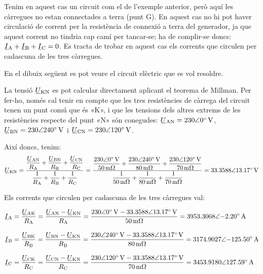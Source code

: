 	
\begin{exemple}[\MillmanTrifNoNeutre{}]
	\addcontentsxms{\MillmanTrifNoNeutre}	
    Tenim en aquest cas un circuit com el de l'exemple anterior, però aquí les càrregues no estan connectades a terra (punt G). En aquest cas no hi pot haver circulació de corrent per la resistència de connexió a terra del generador, ja que aquest corrent no tindria cap camí per tancar-se; ha de complir-se doncs: $\cmplx{I}\ped{A} + \cmplx{I}\ped{B} + \cmplx{I}\ped{C} = 0$. Es tracta de trobar en aquest cas els corrents que circulen per cadascuna de les tres càrregues.

    En el dibuix  següent es pot veure el circuit elèctric que es vol resoldre.

	\begin{center}
		
	\end{center}
   
    La tensió $\cmplx{U}\ped{KN}$ es pot calcular directament aplicant el teorema de Millman. Per fer-ho, només cal tenir en compte que les tres resistències de càrrega del circuit tenen un punt comú que és «K», i que les tensions dels altres extrems de les resistències respecte del punt «N» són conegudes: $\cmplx{U}\ped{AN}=\complexqty{230:0}{V}$, $\cmplx{U}\ped{BN}=\complexqty{230:240}{V}$ i $\cmplx{U}\ped{CN}=\complexqty{230:120}{V}$.

    Així doncs, tenim:
    \[
    \cmplx{U}\ped{KN} = \frac{ \dfrac{\cmplx{U}\ped{AN}}{R\ped{A}} + \dfrac{\cmplx{U}\ped{BN}}{R\ped{B}} + \dfrac{\cmplx{U}\ped{CN}}{R\ped{C}}} { \dfrac{1}{R\ped{A}} + \dfrac{1}{R\ped{B}} + \dfrac{1}{R\ped{C}}} =
    \frac{\dfrac{\complexqty{230:0}{V}}{\qty{50}{m\ohm}}+\dfrac{\complexqty{230:240}{V}}{\qty{80}{m\ohm}}+
    \dfrac{\complexqty{230:120}{V}}{\qty{70}{m\ohm}}}{\dfrac{1}{\qty{50}{m\ohm}}+\dfrac{1}{\qty{80}{m\ohm}}+
    \dfrac{1}{\qty{70}{m\ohm}}} =
    \complexqty{33,3588:13,17}{V}
    \]



    Els corrents que circulen per cadascuna de les tres càrregues val:
    
    \begin{align*}
    \cmplx{I}\ped{A} &= \frac{\cmplx{U}\ped{AK}}{R\ped{A}} = \frac{\cmplx{U}\ped{AN} - \cmplx{U}\ped{KN}}{R\ped{A}} = \frac{\complexqty{230:0}{V}-\complexqty{33,3588:13,17}{V}}{\qty{50}{m\ohm}}
    = \complexqty{3953,3068:-2,20}{A}\\[2ex]
    \cmplx{I}\ped{B} &= \frac{\cmplx{U}\ped{BK}}{R\ped{B}} = \frac{\cmplx{U}\ped{BN} - \cmplx{U}\ped{KN}}{R\ped{B}} = \frac{\complexqty{230:240}{V}-\complexqty{33,3588:13,17}{V}}{\qty{80}{m\ohm}}
    = \complexqty{3174,9027:-125,50}{A}\\[2ex]
    \cmplx{I}\ped{C} &= \frac{\cmplx{U}\ped{CK}}{R\ped{C}} = \frac{\cmplx{U}\ped{CN} - \cmplx{U}\ped{KN}}{R\ped{C}} = \frac{\complexqty{230:120}{V}-\complexqty{33,3588:13,17}{V}}{\qty{70}{m\ohm}}
    = \complexqty{3453,9180:127,59}{A}
    \end{align*}
\end{exemple}


